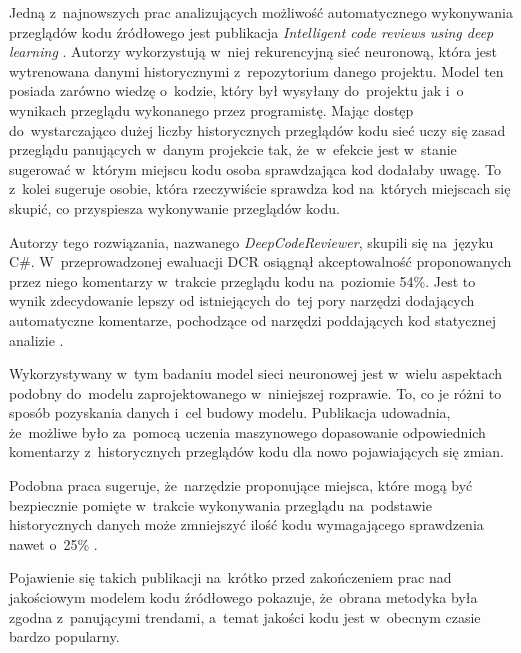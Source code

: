 \documentclass[twoside]{praca}
\begin{document}
Jedną z~najnowszych prac analizujących możliwość automatycznego wykonywania przeglądów kodu źródłowego jest publikacja \textit{Intelligent code reviews using deep learning} \cite{gupta2018intelligent}. Autorzy wykorzystują w~niej rekurencyjną sieć neuronową, która jest wytrenowana danymi historycznymi z~repozytorium danego projektu. Model ten posiada zarówno wiedzę o~kodzie, który był wysyłany do~projektu jak i~o wynikach przeglądu wykonanego przez programistę. Mając dostęp do~wystarczająco dużej liczby historycznych przeglądów kodu sieć uczy się zasad przeglądu panujących w~danym projekcie tak, że~w~efekcie jest w~stanie sugerować w~którym miejscu kodu osoba sprawdzająca kod dodałaby uwagę. To z~kolei sugeruje osobie, która rzeczywiście sprawdza kod na~których miejscach się skupić, co przyspiesza wykonywanie przeglądów kodu.

Autorzy tego rozwiązania, nazwanego \textit{DeepCodeReviewer}, skupili się na~języku C\#. W~przeprowadzonej ewaluacji DCR osiągnął akceptowalność proponowanych przez niego komentarzy w~trakcie przeglądu kodu na~poziomie 54\%. Jest to wynik zdecydowanie lepszy od istniejących do~tej pory narzędzi dodających automatyczne komentarze, pochodzące od narzędzi poddających kod statycznej analizie \cite{balachandran2013reducing}.

Wykorzystywany w~tym badaniu model sieci neuronowej jest w~wielu aspektach podobny do~modelu zaprojektowanego w~niniejszej rozprawie. To, co je różni to sposób pozyskania danych i~cel budowy modelu. Publikacja \cite{gupta2018intelligent} udowadnia, że~możliwe było za~pomocą uczenia maszynowego dopasowanie odpowiednich komentarzy z~historycznych przeglądów kodu dla nowo pojawiających się zmian.

Podobna praca sugeruje, że~narzędzie proponujące miejsca, które mogą być bezpiecznie pomięte w~trakcie wykonywania przeglądu na~podstawie historycznych danych może zmniejszyć ilość kodu wymagającego sprawdzenia nawet o~25\% \cite{baum2018industrial}.

Pojawienie się takich publikacji na~krótko przed zakończeniem prac nad jakościowym modelem kodu źródłowego pokazuje, że~obrana metodyka była zgodna z~panującymi trendami, a~temat jakości kodu jest w~obecnym czasie bardzo popularny.


% 
% 
\end{document}
